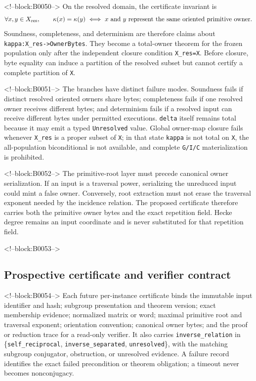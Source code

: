 \documentclass[11pt]{article}
\begin{document}
<!--block:B0050-->
On the resolved domain, the certificate invariant is
\[
  \forall x,y\in X_{\rm res},\qquad
  \kappa(x)=\kappa(y)\ \Longleftrightarrow\
  x\text{ and }y\text{ represent the same oriented primitive owner}.
\]
Soundness, completeness, and determinism are therefore claims about
\texttt{kappa:X\_res->OwnerBytes}.  They become a total-owner theorem for the
frozen population only after the independent closure condition
\texttt{X\_res=X}.  Before closure, byte equality can induce a partition of the
resolved subset but cannot certify a complete partition of \texttt{X}.

<!--block:B0051-->
The branches have distinct failure modes.  Soundness fails if distinct resolved
oriented owners share bytes; completeness fails if one resolved owner receives
different bytes; and determinism fails if a resolved input can receive different
bytes under permitted executions.  \texttt{delta} itself remains total because
it may emit a typed \texttt{Unresolved} value.  Global owner-map closure fails
whenever \texttt{X\_res} is a proper subset of \texttt{X}; in that state
\texttt{kappa} is not total on \texttt{X}, the all-population biconditional is not
available, and complete \texttt{G/I/C} materialization is prohibited.

<!--block:B0052-->
The primitive-root layer must precede canonical owner serialization.
If an input is a traversal power, serializing the unreduced input could
mint a false owner. Conversely, root extraction must not erase the
traversal exponent needed by the incidence relation. The proposed
certificate therefore carries both the primitive owner bytes and the
exact repetition field. Hecke degree remains an input coordinate and is
never substituted for that repetition field.

<!--block:B0053-->
\hypertarget{42-prospective-certificate-and-verifier-contract}{%
\subsection{Prospective certificate and verifier
contract}\label{42-prospective-certificate-and-verifier-contract}}

<!--block:B0054-->
Each future per-instance certificate binds the immutable input identifier and
hash; subgroup presentation and theorem version; exact membership evidence;
normalized matrix or word; maximal primitive root and traversal exponent;
orientation convention; canonical owner bytes; and the proof or reduction trace
for a read-only verifier.  It also carries
\texttt{inverse\_relation} in
\{\texttt{self\_reciprocal}, \texttt{inverse\_separated},
\texttt{unresolved}\}, with the matching subgroup conjugator, obstruction, or
unresolved evidence.  A failure record identifies the exact failed precondition
or theorem obligation; a timeout never becomes nonconjugacy.
\end{document}
